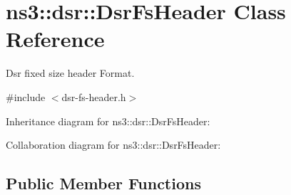 \hypertarget{classns3_1_1dsr_1_1DsrFsHeader}{}\section{ns3\+:\+:dsr\+:\+:Dsr\+Fs\+Header Class Reference}
\label{classns3_1_1dsr_1_1DsrFsHeader}


Dsr fixed size header Format.  




{\ttfamily \#include $<$dsr-\/fs-\/header.\+h$>$}



Inheritance diagram for ns3\+:\+:dsr\+:\+:Dsr\+Fs\+Header\+:


Collaboration diagram for ns3\+:\+:dsr\+:\+:Dsr\+Fs\+Header\+:
\subsection*{Public Member Functions}
